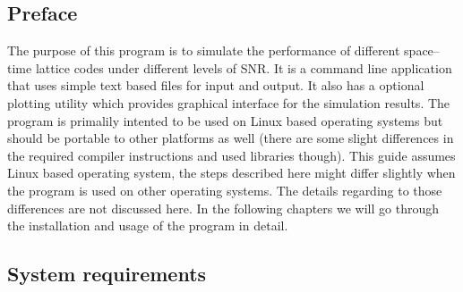 \documentclass[english,12pt,a4paper,pdftex,sci,utf8]{aaltothesis}
\begin{document}
\subsection{Preface}
The purpose of this program is to simulate the performance of different space--time lattice codes under different levels of SNR. It is a command line application that uses simple text based files for input and output. It also has a optional plotting utility which provides graphical interface for the simulation results. The program is primalily intented to be used on Linux based operating systems but should be portable to other platforms as well (there are some slight differences in the required compiler instructions and used libraries though). This guide assumes Linux based operating system, the steps described here might differ slightly when the program is used on other operating systems. The details regarding to those differences are not discussed here. In the following chapters we will go through the installation and usage of the program in detail. 

\subsection{System requirements}
\end{document}
